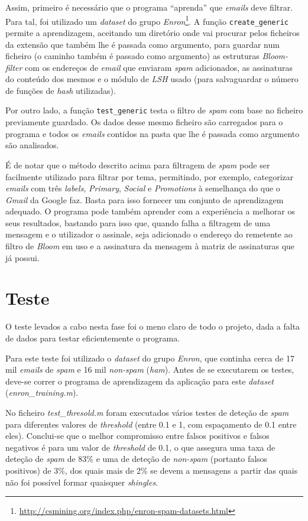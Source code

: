 \documentclass[a4paper,11pt,openright,oneside]{report}
\begin{document}
Assim, primeiro é necessário que o programa ``aprenda'' que \textit{emails} deve filtrar. Para tal, foi utilizado um \textit{dataset} do grupo \textit{Enron}\footnote{\url{http://csmining.org/index.php/enron-spam-datasets.html}}. A função \texttt{create\_generic} permite a aprendizagem, aceitando um diretório onde vai procurar pelos ficheiros da extensão que também lhe é passada como argumento, para guardar num ficheiro (o caminho também é passado como argumento) as estruturas \textit{Bloom-filter} com os endereços de \textit{email} que enviaram \textit{spam} adicionados, as assinaturas do conteúdo dos mesmos e o módulo de \textit{LSH} usado (para salvaguardar o número de funções de \textit{hash} utilizadas).

Por outro lado, a função \texttt{test\_generic} testa o filtro de \textit{spam} com base no ficheiro previamente guardado. Os dados desse mesmo ficheiro são carregados para o programa e todos os \textit{emails} contidos na pasta que lhe é passada como argumento são analisados.

É de notar que o método descrito acima para filtragem de \textit{spam} pode ser facilmente utilizado para filtrar por tema, permitindo, por exemplo, categorizar \textit{emails} com três \textit{labels}, \textit{Primary}, \textit{Social} e \textit{Promotions} à semelhança do que o \textit{Gmail} da Google faz. Basta para isso fornecer um conjunto de aprendizagem adequado. O programa pode também aprender com a experiência a melhorar os seus resultados, bastando para isso que, quando falha a filtragem de uma mensagem e o utilizador o assinale, seja adicionado o endereço do remetente ao filtro de \textit{Bloom} em uso e a assinatura da mensagem à matriz de assinaturas que já possui.

\section{Teste}

O teste levados a cabo nesta fase foi o meno claro de todo o projeto, dada a falta de dados para testar eficientemente o programa.

Para este teste foi utilizado o \textit{dataset} do grupo \textit{Enron}, que continha cerca de 17 mil \textit{emails} de \textit{spam} e 16 mil \textit{non-spam} (\textit{ham}). Antes de se executarem os testes, deve-se correr o programa de aprendizagem da aplicação para este \textit{dataset} (\textit{enron\_training.m}).

No ficheiro \textit{test\_thresold.m} foram executados vários testes de deteção de \textit{spam} para diferentes valores de \textit{threshold} (entre 0.1 e 1, com espaçamento de 0.1 entre eles). Conclui-se que o melhor compromisso entre falsos positivos e falsos negativos é para um valor de \textit{threshold} de 0.1, o que assegura uma taxa de deteção de \textit{spam} de 83\% e uma de deteção de \textit{non-spam} (portanto falsos positivos) de 3\%, dos quais mais de 2\% se devem a mensagens a partir das quais não foi possível formar quaisquer \textit{shingles}.
\end{document}

